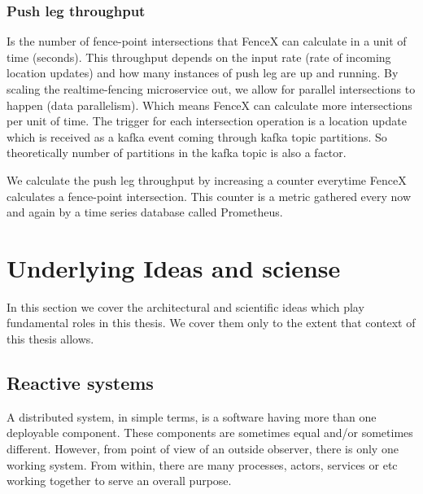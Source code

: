 \documentclass[a4]{report}
\begin{document}
        \subsubsection{Push leg throughput}
        Is the number of fence-point intersections that FenceX can calculate in a unit of time (seconds).
        This throughput depends on the input rate (rate of incoming location updates) and how many instances of push leg
        are up and running.
        By scaling the realtime-fencing microservice out, we allow for parallel intersections to happen (data parallelism).
        Which means FenceX can calculate more intersections per unit of time.
        The trigger for each intersection operation is a location update which is received as a kafka event coming through
        kafka topic partitions.
        So theoretically number of partitions in the kafka topic is also a factor.

        We calculate the push leg throughput by increasing a counter everytime FenceX calculates a fence-point intersection.
        This counter is a metric gathered every now and again by a time series database called Prometheus.

        \section{Underlying Ideas and sciense}
        In this section we cover the architectural and scientific ideas which play fundamental roles in this thesis.
        We cover them only to the extent that context of this thesis allows.

        \subsection{Reactive systems \cite{reactive-microsystems} \cite{reactive-manifesto}}
        A distributed system, in simple terms, is a software having more than one deployable component.
        These components are sometimes equal and/or sometimes different.
        However, from point of view of an outside observer, there is only one working system.
        From within, there are many processes, actors, services or etc working together to serve an overall purpose.
\end{document}
